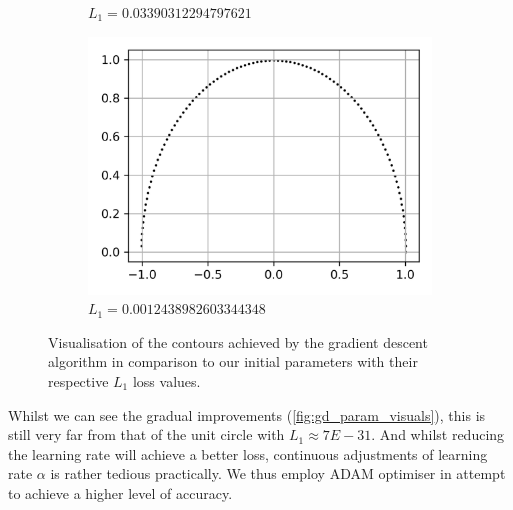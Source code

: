\documentclass[a4paper]{report}
\begin{document}
\begin{figure}[H]
\begin{subfigure}{.33\linewidth}
      \caption{$L_1 = 0.03390312294797621$}
      \label{fig:gd_after_first_run}
    \end{subfigure}\hfill
    \begin{subfigure}{.33\linewidth}
      \includegraphics[width=\linewidth]{images/gd/params_after_GD.png}
      \caption{$L_1 = 0.0012438982603344348$}
      \label{fig:gd_final}
    \end{subfigure}
    
    \caption{Visualisation of the contours achieved by the gradient descent algorithm in comparison to our initial parameters with their respective $L_1$ loss values. }
    \label{fig:gd_param_visuals}
\end{figure}

Whilst we can see the gradual improvements (\autoref{fig:gd_param_visuals}), this is still very far from that of the unit circle with $L_1 \approx 7E-31$. And whilst reducing the learning rate will achieve a better loss, continuous adjustments of learning rate $\alpha$ is rather tedious practically. We thus employ ADAM optimiser in attempt to achieve a higher level of accuracy.

\end{document}
